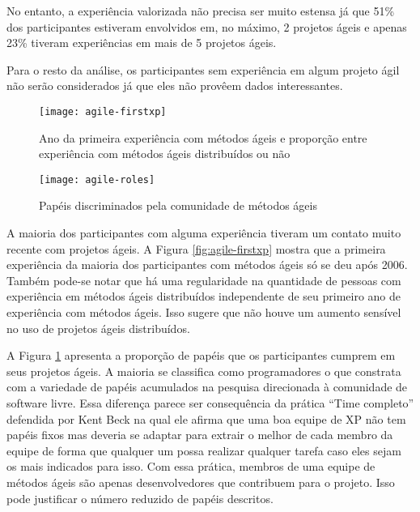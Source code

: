 No entanto, a experiência valorizada não precisa ser muito estensa já
que 51\% dos participantes estiveram envolvidos em, no máximo, 2
projetos ágeis e apenas 23\% tiveram experiências em mais de 5
projetos ágeis.

Para o resto da análise, os participantes sem experiência em algum
projeto ágil não serão considerados já que eles não provêem dados
interessantes.

\begin{figure}[htb]
  \begin{minipage}[t]{0.55\linewidth}
    \centering
    \texttt{[image: agile-firstxp]}
    \caption{Ano da primeira experiência com métodos ágeis e proporção
      entre experiência com métodos ágeis distribuídos ou não}
    \label{fig:agile-firstxp}
  \end{minipage}
  \begin{minipage}[t]{0.45\linewidth}
    \centering
    \texttt{[image: agile-roles]}
    \caption{Papéis discriminados pela comunidade de métodos ágeis}
    \label{fig:agile-roles}
  \end{minipage}
\end{figure}

A maioria dos participantes com alguma experiência tiveram um contato
muito recente com projetos ágeis. A Figura \ref{fig:agile-firstxp}
mostra que a primeira experiência da maioria dos participantes com
métodos ágeis só se deu após 2006. Também pode-se notar que há uma
regularidade na quantidade de pessoas com experiência em métodos ágeis
distribuídos independente de seu primeiro ano de experiência com
métodos ágeis. Isso sugere que não houve um aumento sensível no uso de
projetos ágeis distribuídos.

A Figura \ref{fig:agile-roles} apresenta a proporção de papéis que os
participantes cumprem em seus projetos ágeis. A maioria se classifica
como programadores o que constrata com a variedade de papéis
acumulados na pesquisa direcionada à comunidade de software
livre. Essa diferença parece ser consequência da prática ``Time
completo'' defendida por Kent Beck \cite{XP01} na qual ele afirma
que uma boa equipe de XP não tem papéis fixos mas deveria se adaptar
para extrair o melhor de cada membro da equipe de forma que qualquer
um possa realizar qualquer tarefa caso eles sejam os mais indicados
para isso. Com essa prática, membros de uma equipe de métodos ágeis
são apenas desenvolvedores que contribuem para o projeto. Isso pode
justificar o número reduzido de papéis descritos.

